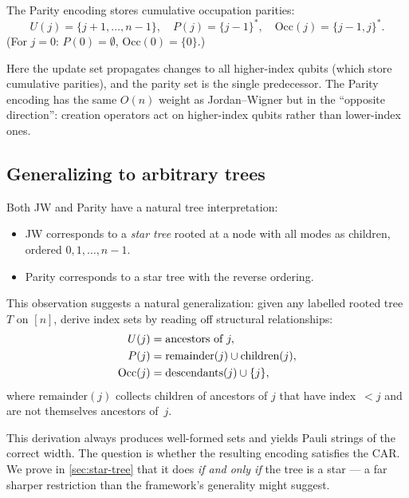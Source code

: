 The Parity encoding stores cumulative occupation parities:
\begin{equation}
  U(j) = \{j{+}1, \ldots, n{-}1\}, \quad
  P(j) = \{j{-}1\}^*, \quad
  \mathrm{Occ}(j) = \{j{-}1, j\}^*.
  \label{eq:parity-sets}
\end{equation}
(For $j = 0$: $P(0) = \emptyset$, $\mathrm{Occ}(0) = \{0\}$.)

Here the update set propagates changes to all higher-index qubits
(which store cumulative parities), and the parity set is the single
predecessor.  The Parity encoding has the same $O(n)$ weight as
Jordan--Wigner but in the ``opposite direction'': creation operators
act on higher-index qubits rather than lower-index ones.

\subsection{Generalizing to arbitrary trees}
\label{sec:tree-derived}

Both JW and Parity have a natural tree interpretation:
\begin{itemize}
  \item JW corresponds to a \emph{star tree} rooted at a node with
    all modes as children, ordered $0, 1, \ldots, n{-}1$.
  \item Parity corresponds to a star tree with the reverse ordering.
\end{itemize}

This observation suggests a natural generalization: given any labelled
rooted tree $T$ on $[n]$, derive index sets by reading off structural
relationships:
\begin{align}
  U(j) &= \text{ancestors of } j, \notag \\
  P(j) &= \text{remainder}(j) \cup \text{children}(j), \notag \\
  \mathrm{Occ}(j) &= \text{descendants}(j) \cup \{j\},
  \label{eq:tree-derived-sets}
\end{align}
where $\text{remainder}(j)$ collects children of ancestors of $j$
that have index~${} < j$ and are not themselves ancestors of~$j$.

This derivation always produces well-formed sets and yields Pauli
strings of the correct width.  The question is whether the resulting
encoding satisfies the CAR.  We prove in \cref{sec:star-tree} that it
does \emph{if and only if} the tree is a star --- a far sharper
restriction than the framework's generality might suggest.
